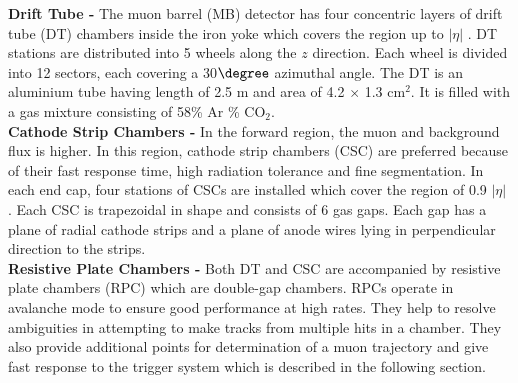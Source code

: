 {\bf Drift Tube -} 
The muon barrel (MB) detector has four concentric layers of drift tube (DT) chambers inside the iron yoke which covers the region up to $|\eta|$ . DT stations are distributed into 5 wheels along the $z$ direction. Each wheel is divided into 12 sectors, each covering a 30$\degree$ azimuthal angle. The DT is an aluminium tube having length of 2.5 m and area of 4.2 $\times$ 1.3 cm$^{2}$. It is filled with a gas mixture consisting of 58\% Ar  \% CO$_{2}$. \\ \newline
{\bf Cathode Strip Chambers -} In the forward region, the muon and background flux is higher. In this region, cathode strip chambers (CSC) are preferred because of their fast response time, high radiation tolerance and fine segmentation. In each end cap, four stations of CSCs are installed which cover the region of 0.9 \ls $|\eta|$ . Each CSC is trapezoidal in shape and consists of 6 gas gaps. Each gap has a plane of radial cathode strips and a plane of anode wires lying in perpendicular direction to the strips. \\ \newline 
{\bf Resistive Plate Chambers -} Both DT and CSC are accompanied by resistive plate chambers (RPC) which are double-gap chambers. RPCs operate in avalanche mode to ensure good performance at high rates. They help to resolve ambiguities in attempting to make tracks from multiple hits in a chamber. They also provide additional points for determination of a muon trajectory and give fast response to the trigger system which is described in the following section.
 
